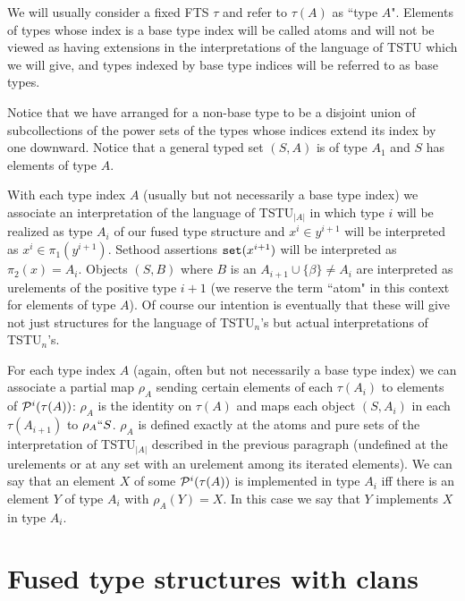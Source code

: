 \documentclass{article}
\begin{document}
We will usually consider a fixed FTS $\tau$ and refer to $\tau(A)$ as ``type $A$".   Elements of types whose index is a base type index will be called atoms and will not be viewed as having extensions in the interpretations of the language of TSTU which we will give, and types indexed by base type indices will be referred to as base types.

Notice that we have arranged for a non-base type to be a disjoint union of subcollections of the power sets of the types whose indices extend its index by one downward.  Notice that a general typed set $(S,A)$ is of type $A_1$ and $S$ has elements of type $A$.

With each type index $A$ (usually but not necessarily a base type index) we associate an interpretation of the language of TSTU$_{|A|}$ in which type $i$ will be realized as type $A_i$ of our fused type structure and $x^i \in y^{i+1}$ will be interpreted
as $x^i \in \pi_1(y^{i+1})$.    Sethood assertions ${\tt set}(x^{i+1})$ will be interpreted as $\pi_2(x)=A_i$.   Objects $(S,B)$ where $B$ is an $A_{i+1} \cup \{\beta\} \neq A_i$ are interpreted as urelements of the positive type $i+1$ (we reserve the term ``atom" in this context for elements of type $A$).   Of course our intention is eventually
that these will give not just structures for the language of TSTU$_n$'s but actual interpretations of TSTU$_n$'s.

For each type index $A$ (again, often but not necessarily a base type index) we can associate a partial map $\rho_A$ sending certain elements of each $\tau(A_i)$ to elements of
${\cal P}^i(\tau(A))$:  $\rho_A$ is the identity on $\tau(A)$ and maps each object $(S,A_i)$ in each $\tau(A_{i+1})$ to $\rho_A``S$.    $\rho_A$ is defined exactly at the atoms
and pure sets of the interpretation of TSTU$_{|A|}$ described in the previous paragraph (undefined at the urelements or at any set with an urelement among its iterated elements).  We can say that an element $X$ of some ${\cal P}^i(\tau(A))$ is implemented in type $A_i$ iff there is an element $Y$ of type $A_i$ with $\rho_A(Y)=X$.   In this case we say that $Y$ implements $X$ in type $A_i$.

\newpage

\section{Fused type structures with clans}
\end{document}
